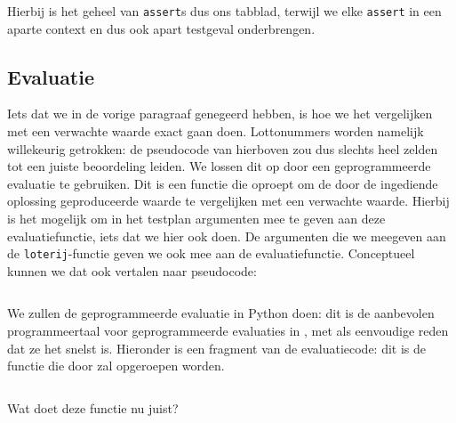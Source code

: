 \inputminted{python}{code/lotto-eval.py}

Hierbij is het geheel van \texttt{assert}s dus ons tabblad, terwijl we elke \texttt{assert} in een aparte context en dus ook apart testgeval onderbrengen.

\subsection{Evaluatie}\label{subsec:oefening-lotto-evaluatie}

Iets dat we in de vorige paragraaf genegeerd hebben, is hoe we het vergelijken met een verwachte waarde exact gaan doen.
Lottonummers worden namelijk willekeurig getrokken: de pseudocode van hierboven zou dus slechts heel zelden tot een juiste beoordeling leiden.
We lossen dit op door een geprogrammeerde evaluatie te gebruiken.
Dit is een functie die \tested{} oproept om de door de ingediende oplossing geproduceerde waarde te vergelijken met een verwachte waarde.
Hierbij is het mogelijk om in het testplan argumenten mee te geven aan deze evaluatiefunctie, iets dat we hier ook doen.
De argumenten die we meegeven aan de \texttt{loterij}-functie geven we ook mee aan de evaluatiefunctie.
Conceptueel kunnen we dat ook vertalen naar pseudocode:

\inputminted{python}{code/lotto-eval-programmed.py}

We zullen de geprogrammeerde evaluatie in Python doen: dit is de aanbevolen programmeertaal voor geprogrammeerde evaluaties in \tested{}, met als eenvoudige reden dat ze het snelst is.
Hieronder is een fragment van de evaluatiecode: dit is de functie die door \tested{} zal opgeroepen worden.

\inputminted[firstline=42,lastline=48]{python}{sources/lotto-evaluator.py}

Wat doet deze functie nu juist?

